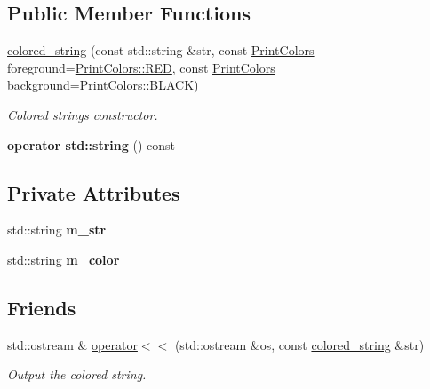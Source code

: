 \subsection*{Public Member Functions}
\begin{DoxyCompactItemize}
\item 
\mbox{\hyperlink{classcolored__string_a73b0c596b43789a0952dfcc9b56c301b}{colored\+\_\+string}} (const std\+::string \&str, const \mbox{\hyperlink{classcolored__string_a76416a7db18c947e5a6d5bf17c78e497}{Print\+Colors}} foreground=\mbox{\hyperlink{classcolored__string_a76416a7db18c947e5a6d5bf17c78e497aa2d9547b5d3dd9f05984475f7c926da0}{Print\+Colors\+::\+R\+ED}}, const \mbox{\hyperlink{classcolored__string_a76416a7db18c947e5a6d5bf17c78e497}{Print\+Colors}} background=\mbox{\hyperlink{classcolored__string_a76416a7db18c947e5a6d5bf17c78e497a08d0012388564e95c3b4a7407cf04965}{Print\+Colors\+::\+B\+L\+A\+CK}})
\begin{DoxyCompactList}\small\item\em Colored string\textquotesingle{}s constructor. \end{DoxyCompactList}\item 
\mbox{\label{classcolored__string_a530408625112fe887b3fd5cf5965f03e}} 
{\bfseries operator std\+::string} () const
\end{DoxyCompactItemize}
\subsection*{Private Attributes}
\begin{DoxyCompactItemize}
\item 
\mbox{\label{classcolored__string_a2506a30243275fae082420c55d087734}} 
std\+::string {\bfseries m\+\_\+str}
\item 
\mbox{\label{classcolored__string_a6028a3a4cec1476dfb4ce48d3f901812}} 
std\+::string {\bfseries m\+\_\+color}
\end{DoxyCompactItemize}
\subsection*{Friends}
\begin{DoxyCompactItemize}
\item 
std\+::ostream \& \mbox{\hyperlink{classcolored__string_a7a425cff7a8554e3612f1ccadb100117}{operator$<$$<$}} (std\+::ostream \&os, const \mbox{\hyperlink{classcolored__string}{colored\+\_\+string}} \&str)
\begin{DoxyCompactList}\small\item\em Output the colored string. \end{DoxyCompactList}\end{DoxyCompactItemize}


